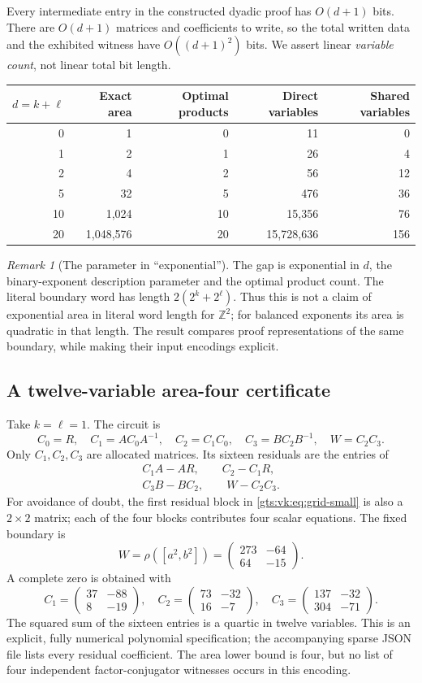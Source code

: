 \documentclass[11pt,letterpaper]{article}
\theoremstyle{definition}
\theoremstyle{remark}
\newtheorem{remark}[theorem]{Remark}
\newcommand{\Z}{\mathbb Z}
\newcommand{\smallmat}[4]{\begin{pmatrix}#1&#2\\#3&#4\end{pmatrix}}
\begin{document}
Every intermediate entry in the constructed dyadic proof has $O(d+1)$ bits. There are $O(d+1)$ matrices and coefficients to write, so the total written data and the exhibited witness have $O((d+1)^2)$ bits. We assert linear \emph{variable count}, not linear total bit length.

\begin{center}
\begin{tabular}{rrrrr}
\toprule
$d=k+\ell$ & Exact area & Optimal products & Direct variables & Shared variables\\
\midrule
0 & 1 & 0 & 11 & 0\\
1 & 2 & 1 & 26 & 4\\
2 & 4 & 2 & 56 & 12\\
5 & 32 & 5 & 476 & 36\\
10 & 1,024 & 10 & 15,356 & 76\\
20 & 1,048,576 & 20 & 15,728,636 & 156\\
\bottomrule
\end{tabular}
\end{center}

\begin{remark}[The parameter in ``exponential'']
The gap is exponential in $d$, the binary-exponent description parameter and the optimal product count. The literal boundary word has length $2(2^k+2^\ell)$. Thus this is not a claim of exponential area in literal word length for $\Z^2$; for balanced exponents its area is quadratic in that length. The result compares proof representations of the same boundary, while making their input encodings explicit.
\end{remark}

\subsection{A twelve-variable area-four certificate}

Take $k=\ell=1$. The circuit is
\[
 C_0=R,\quad C_1=AC_0A^{-1},\quad C_2=C_1C_0,
 \quad C_3=BC_2B^{-1},\quad W=C_2C_3.
\]
Only $C_1,C_2,C_3$ are allocated matrices. Its sixteen residuals are the entries of
\begin{equation}\label{gts:vk:eq:grid-small}
 \begin{gathered}
 C_1A-AR,\qquad C_2-C_1R,\\
 C_3B-BC_2,\qquad W-C_2C_3.
 \end{gathered}
\end{equation}
For avoidance of doubt, the first residual block in \eqref{gts:vk:eq:grid-small} is also a $2\times2$ matrix; each of the four blocks contributes four scalar equations. The fixed boundary is
\[
 W=\rho([a^2,b^2])=\smallmat{273}{-64}{64}{-15}.
\]
A complete zero is obtained with
\[
 C_1=\smallmat{37}{-88}{8}{-19},\quad
 C_2=\smallmat{73}{-32}{16}{-7},\quad
 C_3=\smallmat{137}{-32}{304}{-71}.
\]
The squared sum of the sixteen entries is a quartic in twelve variables. This is an explicit, fully numerical polynomial specification; the accompanying sparse JSON file lists every residual coefficient. The area lower bound is four, but no list of four independent factor-conjugator witnesses occurs in this encoding.
\end{document}
